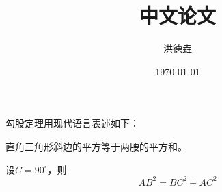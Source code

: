 \documentclass{ctexart}
\title{\heiti 中文论文}
\author{\kaishu 洪德垚}
\date{\today}
\newcommand \degree {^\circ}
\begin{document}
    \maketitle
    勾股定理用现代语言表述如下：

    直角三角形斜边的平方等于两腰的平方和。

    设$C=90\degree$，则
    \begin{equation}
        AB^2 = BC^2 + AC^2
    \end{equation}
\end{document}
